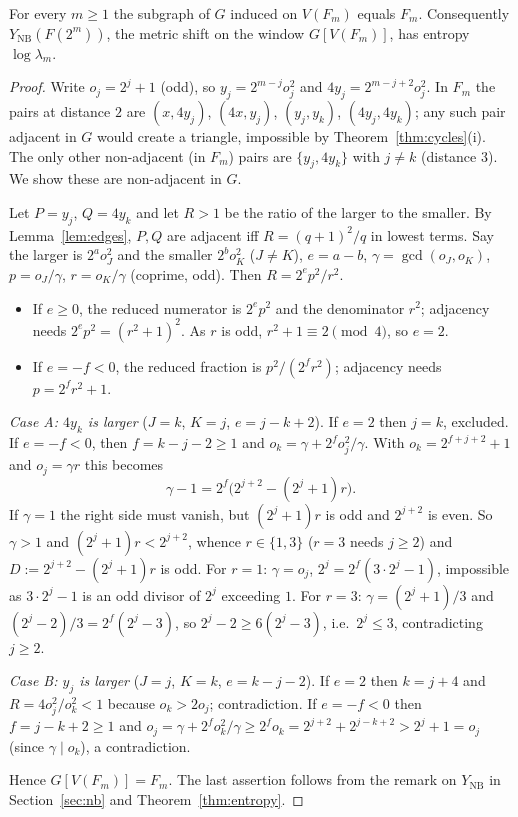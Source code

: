 \begin{theorem}\label{thm:induced}
For every $m\ge1$ the subgraph of $G$ induced on $V(F_m)$ equals $F_m$. Consequently $Y_{\mathrm{NB}}(F(2^m))$, the metric shift on the window $G[V(F_m)]$, has entropy $\log\lambda_m$.
\end{theorem}
\begin{proof}
Write $o_j=2^j+1$ (odd), so $y_j=2^{m-j}o_j^2$ and $4y_j=2^{m-j+2}o_j^2$. In $F_m$ the pairs at distance $2$ are $(x,4y_j)$, $(4x,y_j)$, $(y_j,y_k)$, $(4y_j,4y_k)$; any such pair adjacent in $G$ would create a triangle, impossible by Theorem~\ref{thm:cycles}(i). The only other non-adjacent (in $F_m$) pairs are $\{y_j,4y_k\}$ with $j\ne k$ (distance $3$). We show these are non-adjacent in $G$.

Let $P=y_j$, $Q=4y_k$ and let $R>1$ be the ratio of the larger to the smaller. By Lemma~\ref{lem:edges}, $P,Q$ are adjacent iff $R=(q+1)^2/q$ in lowest terms. Say the larger is $2^a o_J^2$ and the smaller $2^bo_K^2$ ($J\ne K$), $e=a-b$, $\gamma=\gcd(o_J,o_K)$, $p=o_J/\gamma$, $r=o_K/\gamma$ (coprime, odd). Then $R=2^ep^2/r^2$.
\begin{itemize}[itemsep=1pt]
\item If $e\ge0$, the reduced numerator is $2^ep^2$ and the denominator $r^2$; adjacency needs $2^ep^2=(r^2+1)^2$. As $r$ is odd, $r^2+1\equiv2\pmod 4$, so $e=2$.
\item If $e=-f<0$, the reduced fraction is $p^2/(2^fr^2)$; adjacency needs $p=2^fr^2+1$.
\end{itemize}
\emph{Case A: $4y_k$ is larger} ($J=k$, $K=j$, $e=j-k+2$). If $e=2$ then $j=k$, excluded. If $e=-f<0$, then $f=k-j-2\ge1$ and $o_k=\gamma+2^fo_j^2/\gamma$. With $o_k=2^{f+j+2}+1$ and $o_j=\gamma r$ this becomes
\[
\gamma-1=2^f\bigl(2^{j+2}-(2^j+1)r\bigr).
\]
If $\gamma=1$ the right side must vanish, but $(2^j+1)r$ is odd and $2^{j+2}$ is even. So $\gamma>1$ and $(2^j+1)r<2^{j+2}$, whence $r\in\{1,3\}$ ($r=3$ needs $j\ge2$) and $D:=2^{j+2}-(2^j+1)r$ is odd. For $r=1$: $\gamma=o_j$, $2^j=2^f(3\cdot2^j-1)$, impossible as $3\cdot2^j-1$ is an odd divisor of $2^j$ exceeding $1$. For $r=3$: $\gamma=(2^j+1)/3$ and $(2^j-2)/3=2^f(2^j-3)$, so $2^j-2\ge6(2^j-3)$, i.e.\ $2^j\le3$, contradicting $j\ge2$.

\emph{Case B: $y_j$ is larger} ($J=j$, $K=k$, $e=k-j-2$). If $e=2$ then $k=j+4$ and $R=4o_j^2/o_k^2<1$ because $o_k>2o_j$; contradiction. If $e=-f<0$ then $f=j-k+2\ge1$ and $o_j=\gamma+2^fo_k^2/\gamma\ge2^fo_k=2^{j+2}+2^{j-k+2}>2^j+1=o_j$ (since $\gamma\mid o_k$), a contradiction.

Hence $G[V(F_m)]=F_m$. The last assertion follows from the remark on $Y_{\mathrm{NB}}$ in Section~\ref{sec:nb} and Theorem~\ref{thm:entropy}. \qedhere
\end{proof}


